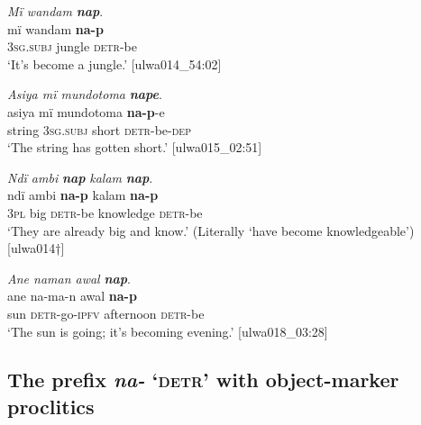 \ea%
    \label{ex:syntax:325}
          \textit{Mï wandam} \textbf{\textit{nap}}.\\
\gll mï      wandam  \textbf{na-p}\\
    3\textsc{sg.subj}  jungle    \textsc{detr}{}-be\\
\glt `It’s become a jungle.’ [ulwa014\_54:02]
\z

\ea%
    \label{ex:syntax:326}
          \textit{Asiya mï mundotoma} \textbf{\textit{nape}}.\\
\gll asiya  mï      mundotoma  \textbf{na-p}{}-e\\
    string  3\textsc{sg.subj}  short      \textsc{detr}{}-be-\textsc{dep}\\
\glt `The string has gotten short.’ [ulwa015\_02:51]
\z

\ea%
    \label{ex:syntax:327}
          \textit{Ndï ambi} \textbf{\textit{nap}} \textit{kalam} \textbf{\textit{nap}}.\\
\gll ndï  ambi  \textbf{na-p}    kalam    \textbf{na-p}\\
    3\textsc{pl}  big    \textsc{detr}{}-be  knowledge    \textsc{detr}{}-be\\
\glt `They are already big and know.’ (Literally ‘have become knowledgeable’) [ulwa014†]
\z

\ea%
    \label{ex:syntax:328}
          \textit{Ane naman awal} \textbf{\textit{nap}}.\\
\gll ane  na-ma-n    awal    \textbf{na-p}\\
    sun  \textsc{detr}{}-go-\textsc{ipfv}  afternoon  \textsc{detr}{}-be\\
\glt `The sun is going; it’s becoming evening.’ [ulwa018\_03:28]
\z

\subsection{The prefix \textit{na-} ‘\textsc{detr}’ with object-marker proclitics}\label{sec:13.8.7}


